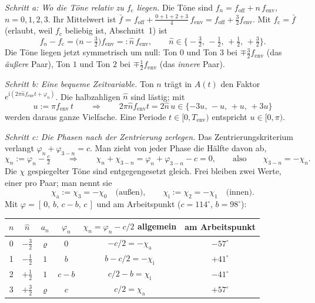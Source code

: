 \documentclass[11pt,a4paper]{article}
\begin{document}
\smallskip
\noindent\textit{Schritt a: Wo die Töne relativ zu \boldmath$f_\mathrm{c}$ liegen.}
Die Töne sind $f_n = f_\mathrm{off} + n\,f_\mathrm{env}$, $n=0,1,2,3$. Ihr
Mittelwert ist
$\bar f = f_\mathrm{off} + \tfrac{0+1+2+3}{4}\,f_\mathrm{env} = f_\mathrm{off}+\tfrac32 f_\mathrm{env}$.
Mit $f_\mathrm{c}=\bar f$ (erlaubt, weil $f_\mathrm{c}$ beliebig ist,
Abschnitt~1) ist
\begin{equation}
  f_n - f_\mathrm{c} = \bigl(n-\tfrac32\bigr) f_\mathrm{env} =: \hat n\, f_\mathrm{env},
  \qquad \hat n \in \bigl\{-\tfrac32,\,-\tfrac12,\,+\tfrac12,\,+\tfrac32\bigr\} .
\end{equation}
Die Töne liegen jetzt symmetrisch um null: Ton $0$ und Ton $3$ bei
$\mp\tfrac32 f_\mathrm{env}$ (das \emph{äußere} Paar), Ton $1$ und Ton $2$ bei
$\mp\tfrac12 f_\mathrm{env}$ (das \emph{innere} Paar).

\smallskip
\noindent\textit{Schritt b: Eine bequeme Zeitvariable.}
Ton $n$ trägt in $A(t)$ den Faktor
$e^{\mathrm{i}(2\pi\hat n f_\mathrm{env}t + \varphi_n)}$. Die halbzahligen
$\hat n$ sind lästig; mit
\begin{equation}
  u := \pi f_\mathrm{env}\,t
  \qquad\Longrightarrow\qquad
  2\pi\hat n f_\mathrm{env} t = 2\hat n\,u \in \{-3u,\,-u,\,+u,\,+3u\}
\end{equation}
werden daraus ganze Vielfache. Eine Periode $t\in[0,T_\mathrm{env})$
entspricht $u\in[0,\pi)$.

\smallskip
\noindent\textit{Schritt c: Die Phasen nach der Zentrierung zerlegen.}
Das Zentrierungskriterium verlangt $\varphi_n+\varphi_{3-n}=c$. Man zieht
von jeder Phase die Hälfte davon ab,
\begin{equation}
  \chi_n := \varphi_n - \tfrac{c}{2}
  \qquad\Longrightarrow\qquad
  \chi_n + \chi_{3-n} = \varphi_n+\varphi_{3-n} - c = 0,
  \qquad\text{also}\qquad \chi_{3-n} = -\chi_n .
\end{equation}
Die $\chi$ gespiegelter Töne sind entgegengesetzt gleich. Frei bleiben zwei
Werte, einer pro Paar; man nennt sie
\begin{equation}
  \chi_\mathrm{a} := \chi_3 = -\chi_0 \quad\text{(außen)},
  \qquad
  \chi_\mathrm{i} := \chi_2 = -\chi_1 \quad\text{(innen)} .
\end{equation}
Mit $\varphi = [\,0,\,b,\,c-b,\,c\,]$ und am Arbeitspunkt ($c=114^\circ$,
$b=98^\circ$):
\begin{center}
\begin{tabular}{@{}cccccc@{}}
  \toprule
  $n$ & $\hat n$ & $a_n$ & $\varphi_n$ & $\chi_n=\varphi_n-c/2$ allgemein & am Arbeitspunkt\\
  \midrule
  0 & $-\tfrac32$ & $\varrho$ & $0$     & $-c/2 = -\chi_\mathrm{a}$     & $-57^\circ$\\
  1 & $-\tfrac12$ & $1$       & $b$     & $b-c/2 = -\chi_\mathrm{i}$    & $+41^\circ$\\
  2 & $+\tfrac12$ & $1$       & $c-b$   & $c/2-b = \chi_\mathrm{i}$     & $-41^\circ$\\
  3 & $+\tfrac32$ & $\varrho$ & $c$     & $c/2 = \chi_\mathrm{a}$       & $+57^\circ$\\
  \bottomrule
\end{tabular}
\end{center}
\end{document}

